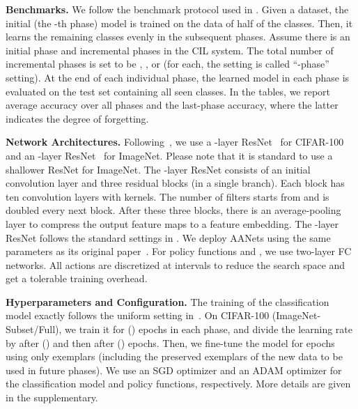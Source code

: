 \documentclass{article}
\newcommand{\myparagraph}[1]{\vspace{0.1em}\noindent\textbf{#1}}
\begin{document}
\myparagraph{Benchmarks.}
We follow the benchmark protocol used in \cite{douillard2020podnet,hou2019lucir,Liu2020AANets,liu2020mnemonics}.
Given a dataset, the initial (the -th phase) model is trained on the data of half of the classes.
Then, it learns the remaining classes evenly in the subsequent  phases. 
Assume there is an initial phase and  incremental phases in the CIL system. The total number of incremental phases  is set to be , , or  (for each, the setting is called ``-phase'' setting).
At the end of each individual phase, the learned model in each phase is evaluated on the test set containing all seen classes. In the tables, we report average accuracy over all phases and the last-phase accuracy, where the latter indicates the degree of forgetting.

\myparagraph{Network Architectures.}
Following~\cite{hou2019lucir,Liu2020AANets,rebuffi2017icarl,Wu2019LargeScale}, we use a -layer ResNet~\cite{rebuffi2017icarl} for CIFAR-100 and an -layer ResNet~\cite{He_CVPR2016_ResNet} for ImageNet. Please note that it is standard to use a shallower ResNet for ImageNet.
The -layer ResNet consists of an initial convolution layer and three residual blocks (in a single branch). Each block has ten convolution layers with  kernels. The number of filters starts from  and is doubled every next block. After these three blocks, there is an average-pooling layer to compress the output feature maps to a feature embedding. The -layer ResNet follows the standard settings in \cite{He_CVPR2016_ResNet}. We deploy AANets using the same parameters as its original paper~\cite{Liu2020AANets}. For policy functions  and , we use two-layer FC networks. All actions are discretized at  intervals to reduce the search space and get a tolerable training overhead.

\myparagraph{Hyperparameters and Configuration.}
The training of the classification model  exactly follows the uniform setting in~\cite{douillard2020podnet,hou2019lucir,Liu2020AANets,liu2020mnemonics}. On CIFAR-100 (ImageNet-Subset/Full), we train it for  () epochs in each phase, and divide the learning rate by  after  () and then after  () epochs. 
Then, we fine-tune the model for  epochs using only exemplars (including the preserved exemplars of the new data to be used in future phases).
We use an SGD optimizer and an ADAM optimizer for the classification model and policy functions, respectively. 
More details are given in the supplementary.
\end{document}

